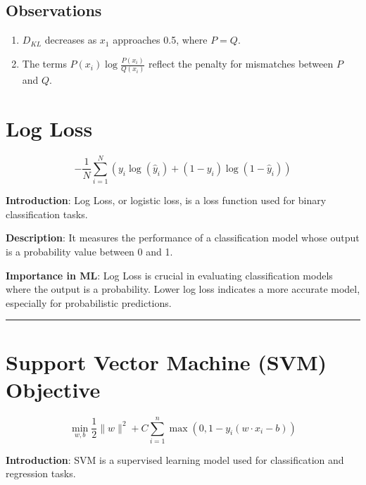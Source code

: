 \documentclass[
  12 pt,
  a4paper,
]{book}
\providecommand{\tightlist}{%
  \setlength{\itemsep}{0pt}\setlength{\parskip}{0pt}}
\numberwithin{equation}{section}
\theoremstyle{plain}      %
\theoremstyle{definition} %
\theoremstyle{remark}     %
\theoremstyle{note}         %
\begin{document}
\hypertarget{observations-1}{%
\section{Observations}\label{observations-1}}

\begin{enumerate}
\def\labelenumi{\arabic{enumi}.}
\tightlist
\item
  \(D_{KL}\) decreases as \(x_1\) approaches 0.5, where \(P = Q\).
\item
  The terms \(P(x_i) \log \frac{P(x_i)}{Q(x_i)}\) reflect the penalty
  for mismatches between \(P\) and \(Q\).
\end{enumerate}

\newpage

\hypertarget{log-loss}{%
\chapter{Log Loss}\label{log-loss}}

\[
-\frac{1}{N} \sum_{i=1}^N \left( y_i \log(\hat{y}_i) + (1 - y_i) \log(1 - \hat{y}_i) \right)
\]

\textbf{Introduction}: Log Loss, or logistic loss, is a loss function
used for binary classification tasks.

\textbf{Description}: It measures the performance of a classification
model whose output is a probability value between 0 and 1.

\textbf{Importance in ML}: Log Loss is crucial in evaluating
classification models where the output is a probability. Lower log loss
indicates a more accurate model, especially for probabilistic
predictions.

\begin{center}\rule{0.5\linewidth}{0.5pt}\end{center}

\newpage

\hypertarget{support-vector-machine-svm-objective}{%
\chapter{Support Vector Machine (SVM)
Objective}\label{support-vector-machine-svm-objective}}

\[
\min_{w, b} \frac{1}{2} \|w\|^2 + C \sum_{i=1}^n \max(0, 1 - y_i (w \cdot x_i - b))
\]

\textbf{Introduction}: SVM is a supervised learning model used for
classification and regression tasks.
\end{document}
